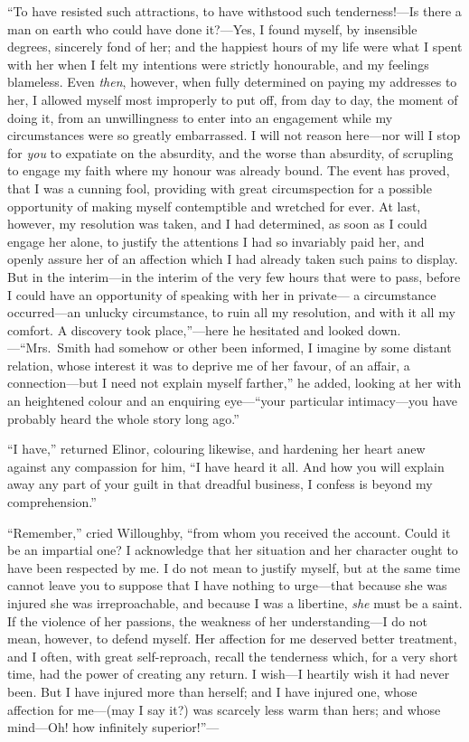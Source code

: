 \documentclass{article}
\begin{document}
``To have resisted such attractions, to have withstood
such tenderness!---Is there a man on earth who could have
done it?---Yes, I found myself, by insensible degrees,
sincerely fond of her; and the happiest hours of my life
were what I spent with her when I felt my intentions
were strictly honourable, and my feelings blameless.
Even \emph{then}, however, when fully determined on paying
my addresses to her, I allowed myself most improperly
to put off, from day to day, the moment of doing it,
from an unwillingness to enter into an engagement
while my circumstances were so greatly embarrassed.
I will not reason here---nor will I stop for \emph{you} to expatiate
on the absurdity, and the worse than absurdity, of scrupling
to engage my faith where my honour was already bound.
The event has proved, that I was a cunning fool,
providing with great circumspection for a possible
opportunity of making myself contemptible and wretched
for ever.  At last, however, my resolution was taken,
and I had determined, as soon as I could engage her alone,
to justify the attentions I had so invariably paid her,
and openly assure her of an affection which I had already
taken such pains to display.  But in the interim---in the
interim of the very few hours that were to pass, before I
could have an opportunity of speaking with her in private---%
a circumstance occurred---an unlucky circumstance, to ruin
all my resolution, and with it all my comfort.  A discovery
took place,''---here he hesitated and looked down.---``Mrs.\ Smith
had somehow or other been informed, I imagine by some
distant relation, whose interest it was to deprive me of
her favour, of an affair, a connection---but I need not
explain myself farther,'' he added, looking at her with an
heightened colour and an enquiring eye---``your particular
intimacy---you have probably heard the whole story long ago.''

``I have,'' returned Elinor, colouring likewise,
and hardening her heart anew against any compassion for him,
``I have heard it all.  And how you will explain away any
part of your guilt in that dreadful business, I confess
is beyond my comprehension.''

``Remember,'' cried Willoughby, ``from whom you received
the account.  Could it be an impartial one?  I acknowledge
that her situation and her character ought to have been
respected by me.  I do not mean to justify myself, but at
the same time cannot leave you to suppose that I have nothing
to urge---that because she was injured she was irreproachable,
and because I was a libertine, \emph{she} must be a saint.
If the violence of her passions, the weakness of her
understanding---I do not mean, however, to defend myself.
Her affection for me deserved better treatment, and I often,
with great self-reproach, recall the tenderness which,
for a very short time, had the power of creating any return.
I wish---I heartily wish it had never been.  But I have injured
more than herself; and I have injured one, whose affection
for me---(may I say it?) was scarcely less warm than hers;
and whose mind---Oh! how infinitely superior!''---%
\end{document}
